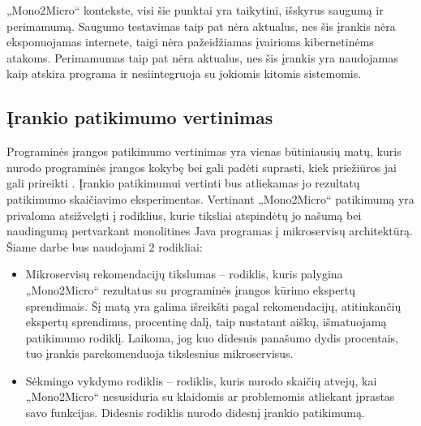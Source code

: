 \documentclass{VUMIFPSbakalaurinis}
\begin{document}
„Mono2Micro“ kontekste, visi šie punktai yra taikytini, išskyrus saugumą ir perimamumą. Saugumo testavimas taip pat nėra aktualus, nes šis įrankis nėra eksponuojamas internete, taigi nėra pažeidžiamas įvairioms kibernetinėms atakoms. Perimamumas taip pat nėra aktualus, nes šis įrankis yra naudojamas kaip atskira programa ir nesiintegruoja su jokiomis kitomis sistemomis.

\subsection{Įrankio patikimumo vertinimas}
Programinės įrangos patikimumo vertinimas yra vienas būtiniausių matų, kuris nurodo programinės įrangos kokybę bei gali padėti suprasti, kiek priežiūros jai gali prireikti \cite{MarCY}. Įrankio patikimumui vertinti bus atliekamas jo rezultatų patikimumo skaičiavimo eksperimentas. Vertinant „Mono2Micro“ patikimumą yra privaloma atsižvelgti į rodiklius, kurie tiksliai atspindėtų jo našumą bei naudingumą pertvarkant monolitines Java programas į mikroservisų architektūrą. Šiame darbe bus naudojami 2 rodikliai:
\begin{itemize}
    \item Mikroservisų rekomendacijų tikslumas -- rodiklis, kuris palygina „Mono2Micro“ rezultatus su programinės įrangos kūrimo ekspertų sprendimais. Šį matą yra galima išreikšti pagal rekomendacijų, atitinkančių ekspertų sprendimus, procentinę dalį, taip nustatant aiškų, išmatuojamą patikimumo rodiklį. Laikoma, jog kuo didesnis panašumo dydis procentais, tuo įrankis parekomenduoja tikslesnius mikroservisus.

    \item Sėkmingo vykdymo rodiklis -- rodiklis, kuris nurodo skaičių atvejų, kai „Mono2Micro“ nesusiduria su klaidomis ar problemomis atliekant įprastas savo funkcijas. Didesnis rodiklis nurodo didesnį įrankio patikimumą.
    \newline 
    



\end{itemize}
\end{document}
